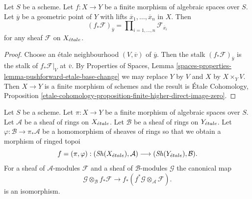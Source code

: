 \begin{lemma}
\label{lemma-stalk-push-finite}
Let $S$ be a scheme. Let $f : X \to Y$ be a finite morphism of algebraic
spaces over $S$. Let $\overline{y}$ be a geometric point of $Y$ with
lifts $\overline{x}_1, \ldots, \overline{x}_n$ in $X$. Then
$$
(f_*\mathcal{F})_{\overline{y}} =
\prod\nolimits_{i = 1, \ldots, n}
\mathcal{F}_{\overline{x}_i}
$$
for any sheaf $\mathcal{F}$ on $X_{\acute{e}tale}$.
\end{lemma}

\begin{proof}
Choose an \'etale neighbourhood $(V, \overline{v})$ of $\overline{y}$.
Then the stalk $(f_*\mathcal{F})_{\overline{y}}$
is the stalk of $f_*\mathcal{F}|_V$ at $\overline{v}$.
By Properties of Spaces,
Lemma \ref{spaces-properties-lemma-pushforward-etale-base-change}
we may replace $Y$ by $V$ and $X$ by $X \times_Y V$.
Then $X \to Y$ is a finite morphism of schemes and the result is
\'Etale Cohomology, Proposition
\ref{etale-cohomology-proposition-finite-higher-direct-image-zero}.
\end{proof}

\begin{lemma}
\label{lemma-finite-rings}
Let $S$ be a scheme. Let $\pi : X \to Y$ be a finite morphism of algebraic
spaces over $S$. Let $\mathcal{A}$ be a sheaf of rings on $X_{\acute{e}tale}$.
Let $\mathcal{B}$ be a sheaf of rings on $Y_{\acute{e}tale}$.
Let $\varphi : \mathcal{B} \to \pi_*\mathcal{A}$
be a homomorphism of sheaves of rings so that we obtain a
morphism of ringed topoi
$$
f = (\pi, \varphi) :
(\mathop{\mathit{Sh}}\nolimits(X_{\acute{e}tale}), \mathcal{A})
\longrightarrow
(\mathop{\mathit{Sh}}\nolimits(Y_{\acute{e}tale}), \mathcal{B}).
$$
For a sheaf of $\mathcal{A}$-modules $\mathcal{F}$ and a
sheaf of $\mathcal{B}$-modules $\mathcal{G}$ the canonical map
$$
\mathcal{G} \otimes_\mathcal{B} f_*\mathcal{F}
\longrightarrow
f_*(f^*\mathcal{G} \otimes_\mathcal{A} \mathcal{F}).
$$
is an isomorphism.
\end{lemma}

